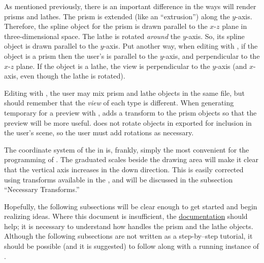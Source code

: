 	As mentioned previously, there is an important difference
	in the ways \IXpov{} will render prisms and lathes.
	The prism is extended (like an ``extrusion'') along the
	$y$-axis. Therefore, the spline object for the prism
	is drawn parallel to the $x$-$z$ plane in three-dimensional space.
	The lathe is rotated \emph{around} the $y$-axis. So, its
	spline object is drawn parallel to the $y$-axis. Put another way,
	when editing with \IXpkg{}, if the object is a prism
	then the user's  is parallel to the
	$y$-axis, and perpendicular to the $x$-$z$ plane. If the
	object is a lathe, the view is perpendicular to the $y$-axis
	(and $x$-axis, even though the lathe is rotated).
	
	Editing with \IXpkg{}, the user may mix prism and lathe
	objects in the same file, but should remember that the
	\emph{view} of each type is different. When generating
	temporary  for a preview with \IXpov{}, \IXpkg{}
	adds a  transform to the prism objects
	so that the preview will be more useful. \IXpkgu{} does
	not rotate objects in  exported for
	inclusion in the user's scene, so the user must add
	rotations as necessary.
	
	The coordinate system of the  in \IXpkg{}
	is, frankly, simply the most convenient for the programming
	of \IXpkg{}. The graduated scales beside the drawing area
	will make it clear that the vertical axis increases
	in the down direction. This is easily corrected using
	transforms available in the , and will be discussed
	in the subsection ``Necessary Transforms.''

	Hopefully, the following subsections will be clear enough
	to get started and begin realizing ideas. Where
	this document is insufficient, the \IXpov{}
	\href{\URLPOVdocs}{documentation} should help;
	it is necessary to understand how \IXpov{} handles the
	prism and the lathe objects.
	Although the following subsections are not written as a
	step-by--step tutorial, it should be possible
	(and it is suggested) to follow along with a running
	instance of \IXpkg{}.

